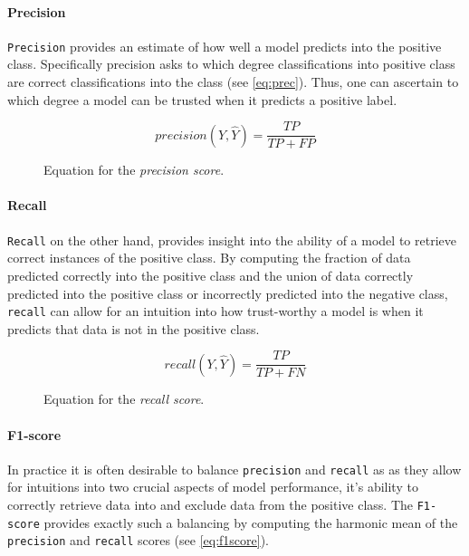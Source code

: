 \paragraph{Precision}
\texttt{Precision} provides an estimate of how well a model predicts into the positive class.
Specifically precision asks to which degree classifications into positive class are correct classifications into the class (see \cref{eq:prec}). Thus, one can ascertain to which degree a model can be trusted when it predicts a positive label.

\begin{figure}[h]
  \begin{equation}\label{eq:prec}
    precision(Y,\hat{Y}) = \frac{TP}{TP + FP}
  \end{equation}
  \caption{Equation for the \textit{precision score}.}
\end{figure}

\paragraph{Recall}
\texttt{Recall} on the other hand, provides insight into the ability of a model to retrieve correct instances of the positive class.
By computing the fraction of data predicted correctly into the positive class and the union of data correctly predicted into the positive class or incorrectly predicted into the negative class, \texttt{recall} can allow for an intuition into how trust-worthy a model is when it predicts that data is not in the positive class.

\begin{figure}[h]
  \begin{equation}\label{eq:rec}
    recall(Y,\hat{Y}) = \frac{TP}{TP + FN}
  \end{equation}
  \caption{Equation for the \textit{recall score}.}
\end{figure}

\paragraph{F1-score}
In practice it is often desirable to balance \texttt{precision} and \texttt{recall} as as they allow for intuitions into two crucial aspects of model performance, it's ability to correctly retrieve data into and exclude data from the positive class. The \texttt{F1-score} provides exactly such a balancing by computing the harmonic mean of the \texttt{precision} and \texttt{recall} scores (see \cref{eq:f1score}).

